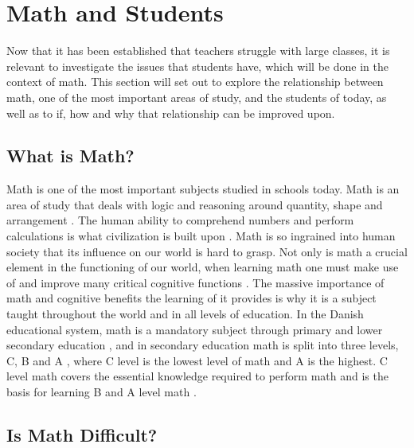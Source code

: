 \section{Math and Students}
Now that it has been established that teachers struggle with large classes, it is relevant to investigate the issues that students have, which will be done in the context of math. This section will set out to explore the relationship between math, one of the most important areas of study, and the students of today, as well as to if, how and why that relationship can be improved upon.

\subsection{What is Math?}
Math is one of the most important subjects studied in schools today. Math is an area of study that deals with logic and reasoning around quantity, shape and arrangement \cite{HomWhatMathematics}. 
\newline\indent
The human ability to comprehend numbers and perform calculations is what civilization is built upon \cite{RomanMathImportance}. Math is so ingrained into human society that its influence on our world is hard to grasp. Not only is math a crucial element in the functioning of our world, when learning math one must make use of and improve many critical cognitive functions \cite{CognitiveEdCircuit}. The massive importance of math and cognitive benefits the learning of it provides is why it is a subject taught throughout the world and in all levels of education.
\newline\newline
In the Danish educational system, math is a mandatory subject through primary and lower secondary education \cite{SubjectsEducation}, and in secondary education math is split into three levels, C, B and A \cite{StxUndervisningsministeriet}, where C level is the lowest level of math and A is the highest. C level math covers the essential knowledge required to perform math and is the basis for learning B and A level math \cite{2017Matematik-C-stx-august-2017}. 
 
\subsection{Is Math Difficult?}

